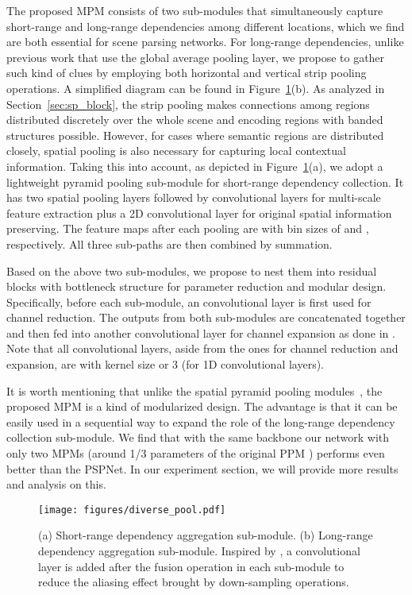 \documentclass[final]{cvpr}
\begin{document}
The proposed MPM consists of two sub-modules that 
simultaneously capture short-range and long-range
dependencies among different locations,
which we find are both essential for scene parsing networks.
For long-range dependencies, unlike previous work
\cite{zhang2018context,zhao2016pyramid,chen2018encoder}
that use the global average pooling layer, we propose to
gather such kind of clues by employing both horizontal
and vertical strip pooling operations.
A simplified diagram can be found in 
Figure~\ref{fig:network}(b).
As analyzed in Section~\ref{sec:sp_block}, the strip 
pooling makes connections among regions distributed 
discretely over the whole scene 
and encoding regions with banded structures possible.
However, for cases where semantic regions are
distributed closely, spatial pooling is also 
necessary for capturing local contextual information.
Taking this into account, as depicted
in Figure~\ref{fig:network}(a),
we adopt a lightweight pyramid pooling sub-module
for short-range dependency collection.
It has two spatial pooling layers followed by 
convolutional layers for multi-scale feature extraction 
plus a 2D convolutional layer 
for original spatial information preserving.
The feature maps after each pooling are with bin sizes 
of  and , respectively.
All three sub-paths are then combined by summation.


Based on the above two sub-modules, we propose to nest them into residual blocks \cite{He2016} with bottleneck structure for parameter reduction and modular design.
Specifically, before each sub-module, an  convolutional layer is first used for channel reduction.
The outputs from both sub-modules are concatenated together and then fed into another  convolutional layer for channel expansion as done in \cite{He2016}.
Note that all convolutional layers, aside from the ones for channel reduction and expansion, are with kernel size  or 3 (for 1D convolutional layers).


It is worth mentioning that unlike the spatial pyramid pooling modules~\cite{zhao2016pyramid,chen2018encoder}, the proposed MPM is a kind of modularized design.
The advantage is that it can be easily used in a sequential way to expand the role of the long-range dependency collection sub-module.
We find that with the same backbone our network with only two MPMs (around 1/3 parameters of the original PPM \cite{zhao2016pyramid}) performs even better than the PSPNet.
In our experiment section, we will provide more  results and analysis on this.

\begin{figure}
  \centering
  \texttt{[image: figures/diverse\_pool.pdf]}
  \caption{(a) Short-range dependency aggregation sub-module. 
  (b) Long-range dependency aggregation sub-module. 
Inspired by \cite{lin2017feature,liu2019simple}, a convolutional layer is added after the fusion operation in each sub-module to reduce the aliasing effect brought by down-sampling operations.
  }
  \label{fig:network}
\end{figure}
\end{document}
